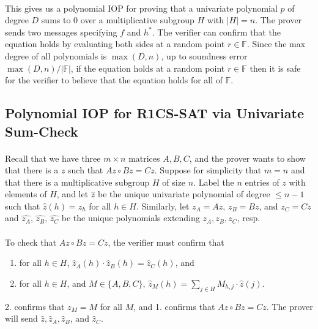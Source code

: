 \documentclass[11pt]{article}
\begin{document}
\paragraph{} This gives us a polynomial IOP for proving that a univariate polynomial $p$ of degree $D$ sums to $0$ over a multiplicative subgroup $H$ with $|H| = n$. The prover sends two messages specifying $f$ and $h^*$. The verifier can confirm that the equation holds by evaluating both sides at a random point $r \in \mathbb{F}$. Since the max degree of all polynomials is $\max(D, n)$, up to soundness error $\max(D, n)/|\mathbb{F}|$, if the equation holds at a random point $r \in \mathbb{F}$ then it is safe for the verifier to believe that the equation holds for all of $\mathbb{F}$.

\subsection{Polynomial IOP for R1CS-SAT via Univariate Sum-Check}
\paragraph{} Recall that we have three $m \times n$ matrices $A, B, C$, and the prover wants to show that there is a $z$ such that $Az \circ Bz = Cz$. Suppose for simplicity that $m = n$ and that there is a multiplicative subgroup $H$ of size $n$. Label the $n$ entries of $z$ with elements of $H$, and let $\hat{z}$ be the unique univariate polynomial of degree $\leq n - 1$ such that $\hat{z}(h) = z_h$ for all $h \in H$. Similarly, let $z_A = Az$, $z_B = Bz$, and $z_C = Cz$ and $\hat{z_A}$, $\hat{z_B}$, $\hat{z_C}$ be the unique polynomials extending $z_A, z_B, z_C$, resp.

\paragraph{} To check that $Az \circ Bz = Cz$, the verifier must confirm that
\begin{enumerate}
    \item for all $h \in H$, $\hat{z}_A(h) \cdot \hat{z}_B(h) = \hat{z}_C(h)$, and
    \item for all $h \in H$, and $M \in \{A, B, C\}$, $\hat{z}_M(h) = \sum_{j \in H}M_{h,j} \cdot \hat{z}(j).$
\end{enumerate}
2. confirms that $z_M = M$ for all $M$, and 1. confirms that $Az \circ Bz = Cz$. The prover will send $\hat{z}, \hat{z}_A, \hat{z}_B$, and $\hat{z}_C$.
\end{document}
